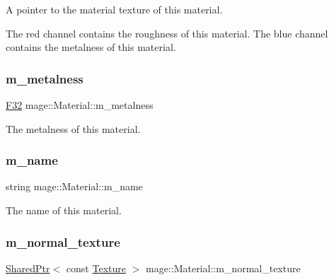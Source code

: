 A pointer to the material texture of this material.

The red channel contains the roughness of this material. The blue channel contains the metalness of this material. \hypertarget{structmage_1_1_material_a40b4b6c0e7b940bdf3764b21cb16fbfb}{}\label{structmage_1_1_material_a40b4b6c0e7b940bdf3764b21cb16fbfb} 
\subsubsection{\texorpdfstring{m\+\_\+metalness}{m\_metalness}}
{\footnotesize\ttfamily \hyperlink{namespacemage_aa97e833b45f06d60a0a9c4fc22ae02c0}{F32} mage\+::\+Material\+::m\+\_\+metalness\hspace{0.3cm}{\ttfamily [private]}}

The metalness of this material. \hypertarget{structmage_1_1_material_a2b3e839a8ae093d53b12529d61ec6605}{}\label{structmage_1_1_material_a2b3e839a8ae093d53b12529d61ec6605} 
\subsubsection{\texorpdfstring{m\+\_\+name}{m\_name}}
{\footnotesize\ttfamily string mage\+::\+Material\+::m\+\_\+name\hspace{0.3cm}{\ttfamily [private]}}

The name of this material. \hypertarget{structmage_1_1_material_adc2d9d68524a55262bd0f4832880b10b}{}\label{structmage_1_1_material_adc2d9d68524a55262bd0f4832880b10b} 
\subsubsection{\texorpdfstring{m\+\_\+normal\+\_\+texture}{m\_normal\_texture}}
{\footnotesize\ttfamily \hyperlink{namespacemage_a1e01ae66713838a7a67d30e44c67703e}{Shared\+Ptr}$<$ const \hyperlink{classmage_1_1_texture}{Texture} $>$ mage\+::\+Material\+::m\+\_\+normal\+\_\+texture\hspace{0.3cm}{\ttfamily [private]}}

